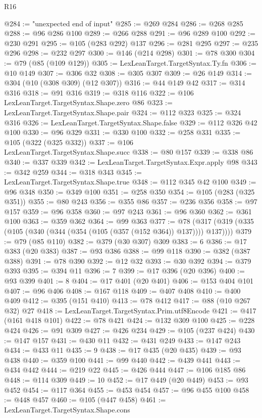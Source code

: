 \begin{lexlean}{R16}
\begin{coremodule}
@284 := "unexpected end of input"
@285 := @269 @284
@286 := @268 @285
@288 := @96 @286 @100
@289 := @266 @288
@291 := @96 @289 @100
@292 := @230 @291
@295 := @105 (@283 @292) @137
@296 := @281 @295
@297 := @235 @296
@298 := @232 @297
@300 := @146 (@214 @298)
@301 := @78 @300
@304 := @79 (@85 (@109 @129))
@305 := LexLeanTarget.TargetSyntax.Ty.fn
@306 := @10 @149
@307 := @306 @32
@308 := @305 @307
@309 := @26 @149
@314 := @304 (@10 (@308 @309) (@12 @307))
@316 := @44 @149 @42
@317 := @314 @316
@318 := @91 @316
@319 := @318 @116
@322 := @106 LexLeanTarget.TargetSyntax.Shape.zero @86
@323 := LexLeanTarget.TargetSyntax.Shape.pair
@324 := @112 @323
@325 := @324 @316
@326 := LexLeanTarget.TargetSyntax.Shape.false
@329 := @112 @326 @42 @100
@330 := @96 @329
@331 := @330 @100
@332 := @258 @331
@335 := @105 (@322 (@325 @332))
@337 := @106 LexLeanTarget.TargetSyntax.Shape.succ
@338 := @80 @157
@339 := @338 @86
@340 := @337 @339
@342 := LexLeanTarget.TargetSyntax.Expr.apply @98
@343 := @342 @259
@344 := @318 @343
@345 := LexLeanTarget.TargetSyntax.Shape.true
@348 := @112 @345 @42 @100
@349 := @96 @348
@350 := @349 @100
@351 := @258 @350
@354 := @105 (@283 (@325 @351))
@355 := @80 @243
@356 := @355 @86
@357 := @236 @356
@358 := @97 @157
@359 := @96 @358
@360 := @97 @243
@361 := @96 @360
@362 := @361 @100
@363 := @359 @362
@364 := @99 @363
@377 := @78 (@317 (@319 (@335 (@105 (@340 (@344 (@354 (@105 (@357 (@152 @364)) @137)))) @137))))
@379 := @79 (@85 @110)
@382 := @379 (@30 @307) @309
@383 := 6
@386 := @17 @383 (@20 @383)
@387 := @93 @386
@388 := @99 @118
@390 := @382 (@387 @388)
@391 := @78 @390
@392 := @12 @32
@393 := @30 @392
@394 := @379 @393
@395 := @394 @11
@396 := 7
@399 := @17 @396 (@20 @396)
@400 := @93 @399
@401 := 8
@404 := @17 @401 (@20 @401)
@406 := @153 @404 @101
@407 := @96 @406
@408 := @167 @118
@409 := @407 @408
@410 := @400 @409
@412 := @395 (@151 @410)
@413 := @78 @412
@417 := @88 (@10 @267 @32) @27
@418 := LexLeanTarget.TargetSyntax.Prim.utf8Encode
@421 := @417 (@161 @418 @101)
@422 := @78 @421
@424 := @132 @309 @100
@425 := @228 @424
@426 := @91 @309
@427 := @426 @234
@429 := @105 (@237 @424)
@430 := @147 @157
@431 := @430 @11
@432 := @431 @249
@433 := @147 @243
@434 := @433 @11
@435 := 9
@438 := @17 @435 (@20 @435)
@439 := @93 @438
@440 := @359 @100
@441 := @99 @440
@442 := @439 @441
@443 := @434 @442
@444 := @219 @22
@445 := @426 @444
@447 := @106 @185 @86
@448 := @114 @309
@449 := 10
@452 := @17 @449 (@20 @449)
@453 := @93 @452
@454 := @117 @364
@455 := @453 @454
@457 := @96 @455 @100
@458 := @448 @457
@460 := @105 (@447 @458)
@461 := LexLeanTarget.TargetSyntax.Shape.cons

\end{coremodule}
\end{lexlean}
